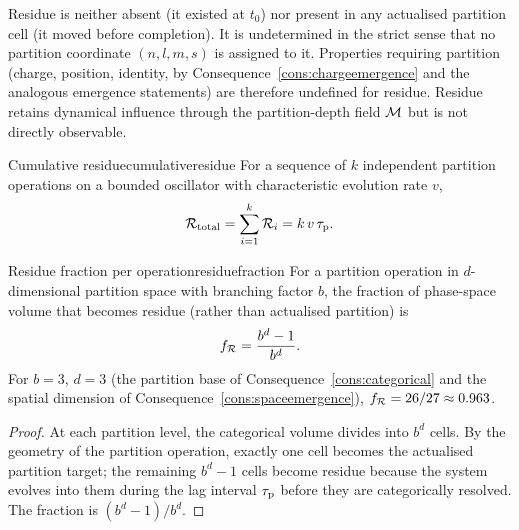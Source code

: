 \begin{remark}
Residue is neither absent (it existed at $t_0$) nor present in any actualised partition cell (it moved before completion). It is undetermined in the strict sense that no partition coordinate $(n,l,m,s)$ is assigned to it. Properties requiring partition (charge, position, identity, by Consequence~\ref{cons:chargeemergence} and the analogous emergence statements) are therefore undefined for residue. Residue retains dynamical influence through the partition-depth field $\mathcal{M}$ but is not directly observable.
\end{remark}

\begin{consequence}{Cumulative residue}{cumulativeresidue}
For a sequence of $k$ independent partition operations on a bounded oscillator with characteristic evolution rate $v$,
\begin{equation}
\mathcal{R}_{\mathrm{total}}=\sum_{i=1}^{k}\mathcal{R}_{i}=k\,v\,\tau_{\mathrm{p}}.
\end{equation}
\end{consequence}

\begin{consequence}{Residue fraction per operation}{residuefraction}
For a partition operation in $d$-dimensional partition space with branching factor $b$, the fraction of phase-space volume that becomes residue (rather than actualised partition) is
\begin{equation}
f_{\mathcal{R}}=\frac{b^{d}-1}{b^{d}}.
\end{equation}
For $b=3$, $d=3$ (the partition base of Consequence~\ref{cons:categorical} and the spatial dimension of Consequence~\ref{cons:spaceemergence}), $f_{\mathcal{R}}=26/27\approx 0.963$.
\end{consequence}

\begin{proof}
At each partition level, the categorical volume divides into $b^{d}$ cells. By the geometry of the partition operation, exactly one cell becomes the actualised partition target; the remaining $b^{d}-1$ cells become residue because the system evolves into them during the lag interval $\tau_{\mathrm{p}}$ before they are categorically resolved. The fraction is $(b^{d}-1)/b^{d}$.
\end{proof}

